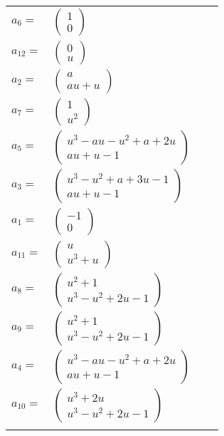 \documentclass[1p]{elsarticle_modified}
\theoremstyle{definition}
\begin{document}
\begin{tabular}{m{7pt} m{180pt} m{7pt} m{180pt} }
\flushright $a_{6}=$&$\begin{pmatrix}1\\0\end{pmatrix}$ \\
\flushright $a_{12}=$&$\begin{pmatrix}0\\u\end{pmatrix}$ \\
\flushright $a_{2}=$&$\begin{pmatrix}a\\a u+u\end{pmatrix}$ \\
\flushright $a_{7}=$&$\begin{pmatrix}1\\u^2\end{pmatrix}$ \\
\flushright $a_{5}=$&$\begin{pmatrix}u^3- a u- u^2+a+2 u\\a u+u-1\end{pmatrix}$ \\
\flushright $a_{3}=$&$\begin{pmatrix}u^3- u^2+a+3 u-1\\a u+u-1\end{pmatrix}$ \\
\flushright $a_{1}=$&$\begin{pmatrix}-1\\0\end{pmatrix}$ \\
\flushright $a_{11}=$&$\begin{pmatrix}u\\u^3+u\end{pmatrix}$ \\
\flushright $a_{8}=$&$\begin{pmatrix}u^2+1\\u^3- u^2+2 u-1\end{pmatrix}$ \\
\flushright $a_{9}=$&$\begin{pmatrix}u^2+1\\u^3- u^2+2 u-1\end{pmatrix}$ \\
\flushright $a_{4}=$&$\begin{pmatrix}u^3- a u- u^2+a+2 u\\a u+u-1\end{pmatrix}$ \\
\flushright $a_{10}=$&$\begin{pmatrix}u^3+2 u\\u^3- u^2+2 u-1\end{pmatrix}$\\&\end{tabular}
\end{document}
